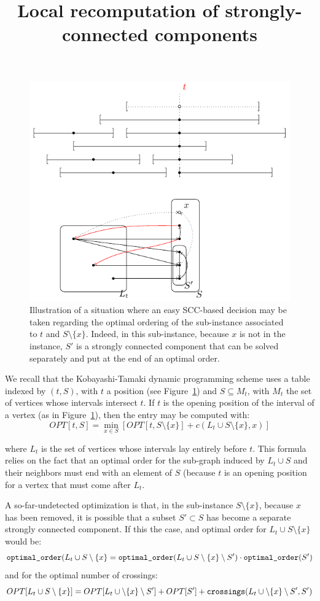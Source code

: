\documentclass{article}
\title{Local recomputation of strongly-connected components}
\begin{document}
\begin{figure}
\includegraphics[width=\textwidth]{tikz_figures/sub_instance.pdf}
\caption{Illustration of a situation where an easy SCC-based decision
may be taken regarding the optimal ordering of 
the sub-instance associated to $t$ and $S\setminus\{x\}$. Indeed, in this
sub-instance, because $x$ is not in the instance, $S'$ is a strongly connected
component that can be solved separately and put at the end of an optimal order.
}
\label{illustration_situation}
\end{figure}

We recall that the Kobayashi-Tamaki dynamic programming scheme uses a table
indexed by $(t,S)$, with $t$ a position (see Figure~\ref{illustration_situation})
and $S\subseteq M_t$, with $M_t$ the set of vertices whose intervals intersect
$t$. If $t$ is the opening position of the interval of a vertex (as in Figure~\ref{illustration_situation}), then the entry may be computed with:
$$OPT[t,S] = \min_{x\in S} \left[OPT[t,S\setminus\{x\}]+c(L_t\cup S\setminus\{x\},x)\right]$$

where $L_t$ is the set of vertices whose intervals lay entirely before
$t$. This formula relies on the fact that an optimal order
for the sub-graph induced by $L_t\cup S$ and their neighbors
must end with an element of $S$ (because $t$ is an opening
position for a vertex that must come after $L_t$.

A so-far-undetected optimization is that, in the sub-instance $S\setminus\{x\}$,
because $x$ has been removed, it is possible that a subset $S'\subset S$
has become a separate strongly connected component. If this the case,
and optimal order for $L_t\cup S\setminus \{x\}$ would be:
$$\text{\tt optimal\_order}(L_t\cup S\setminus\{x\} = \text{\tt optimal\_order}(L_t\cup S\setminus\{x\}\setminus S') \cdot \text{\tt optimal\_order}(S')$$
and for the optimal number of crossings: 
$$OPT[L_t\cup S\setminus\{x\}] = OPT[L_t\cup\setminus\{x\}\setminus S']+OPT[S']+\text{\tt crossings}(L_t\cup\setminus\{x\}\setminus S',S')$$
\end{document}
